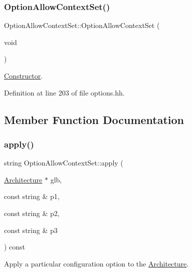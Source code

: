 \subsubsection{\texorpdfstring{OptionAllowContextSet()}{OptionAllowContextSet()}}
{\footnotesize\ttfamily Option\+Allow\+Context\+Set\+::\+Option\+Allow\+Context\+Set (\begin{DoxyParamCaption}\item[{void}]{ }\end{DoxyParamCaption})\hspace{0.3cm}{\ttfamily [inline]}}



\mbox{\hyperlink{class_constructor}{Constructor}}. 



Definition at line 203 of file options.\+hh.



\subsection{Member Function Documentation}
\mbox{\label{class_option_allow_context_set_aff2666342d40ad18914039177a08c666}} 
\subsubsection{\texorpdfstring{apply()}{apply()}}
{\footnotesize\ttfamily string Option\+Allow\+Context\+Set\+::apply (\begin{DoxyParamCaption}\item[{\mbox{\hyperlink{class_architecture}{Architecture}} $\ast$}]{glb,  }\item[{const string \&}]{p1,  }\item[{const string \&}]{p2,  }\item[{const string \&}]{p3 }\end{DoxyParamCaption}) const\hspace{0.3cm}{\ttfamily [virtual]}}



Apply a particular configuration option to the \mbox{\hyperlink{class_architecture}{Architecture}}. 

